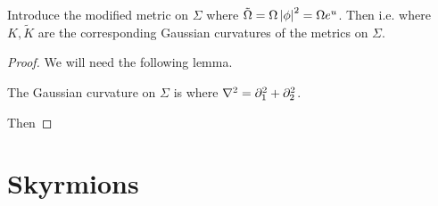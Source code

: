 \documentclass{article}
\begin{document}
\begin{prop}
Introduce the modified metric on $\Sigma$
where $\tilde{\Omega} = \Omega \left\lvert \phi \right\rvert^2 = \Omega e^u$. Then 
i.e. 
where $K,\tilde{K}$ are the corresponding Gaussian curvatures of the metrics on $\Sigma$. 
\end{prop}
\begin{proof}
We will need the following lemma.
\begin{lemma}
The Gaussian curvature on $\Sigma$ is 
where $\nabla^2 = \partial_1^2 + \partial_2^2$. 
\end{lemma}
Then 
\end{proof}

\section{Skyrmions}
\end{document}
